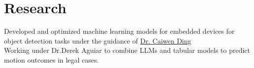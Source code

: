 \documentclass[]{resume-template}
\begin{document}
\begin{minipage}[t]{0.66\textwidth}

  \section{Research}\label{sec:research}
  \textbullet{} Developed and optimized machine learning models for embedded devices for object detection tasks under the guidance of \href{https://caiwending.cse.uconn.edu/}{Dr. Caiwen Ding} \\
  \textbullet{} Working under Dr.Derek Aguiar to combine LLMs and tabular models to predict motion outcomes in legal cases. 



\end{minipage}
\end{document}
